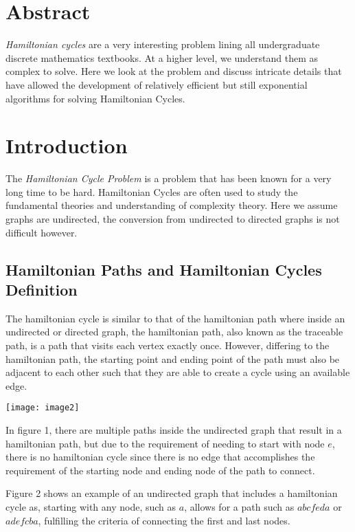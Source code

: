 \newpage

\section{Abstract}

\emph{Hamiltonian cycles} are a very interesting problem lining all
undergraduate discrete mathematics textbooks. At a higher level, we understand
them as complex to solve. Here we look at the problem and discuss intricate
details that have allowed the development of relatively efficient but still
exponential algorithms for solving Hamiltonian Cycles.

\section{Introduction}

The \emph{Hamiltonian Cycle Problem} is a problem that has been known for a very
long time to be hard. Hamiltonian Cycles are often used to study the fundamental
theories and understanding of complexity theory. Here we assume graphs are
undirected, the conversion from undirected to directed graphs is not difficult
however.

\subsection{Hamiltonian Paths and Hamiltonian Cycles Definition}

The hamiltonian cycle is similar to that of the hamiltonian path where inside an
undirected or directed graph, the hamiltonian path, also known as the traceable
path, is a path that visits each vertex exactly once. However, differing to the
hamiltonian path, the starting point and ending point of the path must also be
adjacent to each other such that they are able to create a cycle using an
available edge.

\begin{center}
    \texttt{[image: image2]}
\end{center}

In figure 1, there are multiple paths inside the undirected graph that result in
a hamiltonian path, but due to the requirement of needing to start with node
$e$, there is no hamiltonian cycle since there is no edge that accomplishes the
requirement of the starting node and ending node of the path to connect.

Figure 2 shows an example of an undirected graph that includes a hamiltonian
cycle as, starting with any node, such as $a$, allows for a path such as
$abcfeda$ or $adefcba$, fulfilling the criteria of connecting the first and last
nodes.

